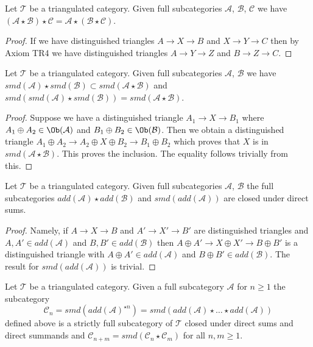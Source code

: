 \begin{lemma}
\label{lemma-associativity-star}
Let $\mathcal{T}$ be a triangulated category.
Given full subcategories $\mathcal{A}$, $\mathcal{B}$, $\mathcal{C}$
we have $(\mathcal{A} \star \mathcal{B}) \star \mathcal{C} =
\mathcal{A} \star (\mathcal{B} \star \mathcal{C})$.
\end{lemma}

\begin{proof}
If we have distinguished triangles $A \to X \to B$ and $X \to Y \to C$
then by Axiom TR4 we have distinguished triangles
$A \to Y \to Z$ and $B \to Z \to C$.
\end{proof}

\begin{lemma}
\label{lemma-smd-star}
Let $\mathcal{T}$ be a triangulated category.
Given full subcategories $\mathcal{A}$, $\mathcal{B}$
we have
$smd(\mathcal{A}) \star smd(\mathcal{B}) \subset
smd(\mathcal{A} \star \mathcal{B})$ and
$smd(smd(\mathcal{A}) \star smd(\mathcal{B})) =
smd(\mathcal{A} \star \mathcal{B})$.
\end{lemma}

\begin{proof}
Suppose we have a distinguished triangle $A_1 \to X \to B_1$ where
$A_1 \oplus A_2 \in \Ob(\mathcal{A})$ and $B_1 \oplus B_2 \in \Ob(\mathcal{B})$.
Then we obtain a distinguished triangle
$A_1 \oplus A_2 \to A_2 \oplus X \oplus B_2 \to B_1 \oplus B_2$
which proves that $X$ is in $smd(\mathcal{A} \star \mathcal{B})$.
This proves the inclusion. The equality follows trivially from this.
\end{proof}

\begin{lemma}
\label{lemma-add-star}
Let $\mathcal{T}$ be a triangulated category. Given full subcategories
$\mathcal{A}$, $\mathcal{B}$ the full subcategories
$add(\mathcal{A}) \star add(\mathcal{B})$ and
$smd(add(\mathcal{A}))$ are closed under direct sums.
\end{lemma}

\begin{proof}
Namely, if $A \to X \to B$ and $A' \to X' \to B'$ are distinguished triangles
and $A, A' \in add(\mathcal{A})$ and $B, B' \in add(\mathcal{B})$ then
$A \oplus A' \to X \oplus X' \to B \oplus B'$ is a distinguished triangle
with $A \oplus A' \in add(\mathcal{A})$ and $B \oplus B' \in add(\mathcal{B})$.
The result for $smd(add(\mathcal{A}))$ is trivial.
\end{proof}

\begin{lemma}
\label{lemma-cone-n}
Let $\mathcal{T}$ be a triangulated category. Given a full subcategory
$\mathcal{A}$ for $n \geq 1$ the subcategory
$$
\mathcal{C}_n = smd(add(\mathcal{A})^{\star n}) =
smd(add(\mathcal{A}) \star \ldots \star add(\mathcal{A}))
$$
defined above is a strictly full subcategory of $\mathcal{T}$
closed under direct sums and direct summands and
$\mathcal{C}_{n + m} = smd(\mathcal{C}_n \star \mathcal{C}_m)$
for all $n, m \geq 1$.
\end{lemma}

